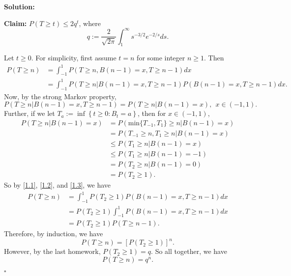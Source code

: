 \documentclass[12pt]{article}
\newcounter{ProofCounter}
\newenvironment{Solution}{\stepcounter{ProofCounter}\textbf{Solution:}}{\hfill$\square$}
\begin{document}
\begin{Solution}

  \textbf{Claim:} $P(T \geq t) \leq 2 q^t$, where
  \[
    q := \frac{2}{\sqrt{2\pi}} \int_{1}^{\infty}  s^{-3/2} e^{-2/s}ds.
  \]

  Let $t \geq 0$. For simplicity, first assume $t = n$ for some integer $n \geq 1$. Then
  \begin{align}
    P(T \geq n) & = \int_{-1}^{1} P(T \geq n, B(n-1) = x, T \geq n-1) dx \nonumber \\
    & = \int_{-1}^{1} P(T \geq n | B(n-1) = x, T \geq n-1) P(B(n-1) = x, T \geq n-1) dx.
    \label{1.1}
  \end{align}
  Now, by the strong Markov property,
  \begin{equation}
    P(T \geq n | B(n-1) = x, T \geq n-1) = P(T \geq n | B(n-1) = x), \ \ x \in (-1, 1).
    \label{1.2}
  \end{equation}
  Further, if we let $T_a := \inf \left\{ t \geq 0 : B_t = a \right\}$, then for $x \in (-1, 1)$,
  \begin{align}
    P(T \geq n | B(n-1) = x) & = P( \text{min}\{T_{-1}, T_1 \} \geq n | B(n-1) = x)  \nonumber \\
    & = P(T_{-1} \geq n, T_1 \geq n | B(n-1) = x) \nonumber \\
    & \leq P(T_1 \geq n | B(n-1) = x) \nonumber \\
    & \leq P(T_1 \geq n | B(n-1) = -1) \nonumber \\
    & = P(T_2 \geq n | B(n-1) = 0) \nonumber \\
    & = P(T_2 \geq 1).
    \label{1.3}
  \end{align}
  So by \eqref{1.1}, \eqref{1.2}, and \eqref{1.3}, we have
  \begin{align}
    P(T \geq n) & = \int_{-1}^{1} P(T_2 \geq 1) P(B(n-1) = x, T \geq n-1) dx \nonumber \\
    & = P(T_2 \geq 1) \int_{-1}^{1} P(B(n-1) = x, T \geq n-1) dx \nonumber \\
    & = P(T_2 \geq 1) P(T \geq n-1).
    \label{1.4}
  \end{align}
  Therefore, by induction, we have
  \begin{equation}
    P(T \geq n) = [P(T_2 \geq 1)]^n.
    \label{1.5}
  \end{equation}
  However, by the last homework, $P(T_2 \geq 1) = q$. So all together, we have
  \begin{equation}
    P(T \geq n) = q^n.
    \label{1.5b}
  \end{equation}

\end{Solution}
\end{document}
